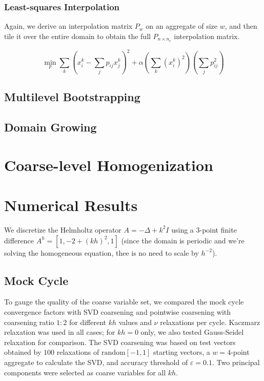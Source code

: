 \documentclass{article}
\begin{document}
\subsubsection{Least-squares Interpolation}
Again, we derive an interpolation matrix $P_w$ on an aggregate of size $w$, and then tile it over the entire domain to obtain the full $P_{n \times n_c}$ interpolation matrix.

\begin{equation}
	\min_p \sum_k \left( x^k_i - \sum_j p_{ij} x^k_j \right)^2 + \alpha \left( \sum_k (x^k_i)^2 \right) \left(\sum_j p_{ij}^2\right) 
\end{equation}

\subsection{Multilevel Bootstrapping}

\subsection{Domain Growing}

\section{Coarse-level Homogenization}


\section{Numerical Results}
We discretize the Helmholtz operator $A = -\Delta + k^2 I$ using a $3$-point finite difference $A^h = [1, -2 + (kh)^2, 1]$ (since the domain is periodic and we're solving the homogeneous equation, thee is no need to scale by $h^{-2}$).

\subsection{Mock Cycle}
\label{mock_cycle}
To gauge the quality of the coarse variable set, we compared the mock cycle convergence factors with SVD coarsening and pointwise coarsening with coarsening ratio $1:2$ for different $kh$ values and $\nu$ relaxations per cycle. Kaczmarz relaxation was used in all cases; for $kh=0$ only, we also tested Gauss-Seidel relaxation for comparison. The SVD coarsening was based on test vectors obtained by $100$ relaxations of $\text{random}[-1,1]$ starting vectors, a $w=4$-point aggregate to calculate the SVD, and accuracy threshold of  $\varepsilon=0.1$. Two principal components were selected as coarse variables for all $kh$.
 
\end{document}
